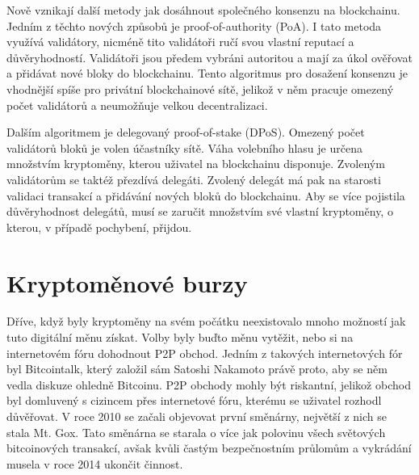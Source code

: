 Nově vznikají další metody jak dosáhnout společného konsenzu na blockchainu. Jedním z těchto nových způsobů je proof-of-authority (PoA). I tato
metoda využívá validátory, nicméně tito validátoři ručí svou vlastní reputací a důvěryhodností. Validátoři jsou předem vybráni autoritou a mají
za úkol ověřovat a přidávat nové bloky do blockchainu. Tento algoritmus pro dosažení konsenzu je vhodnější spíše pro privátní blockchainové sítě,
jelikož v něm pracuje omezený počet validátorů a neumožňuje velkou decentralizaci.

Dalším algoritmem je delegovaný proof-of-stake (DPoS). Omezený počet validátorů bloků je volen účastníky sítě. Váha volebního hlasu
je určena množstvím kryptoměny, kterou uživatel na blockchainu disponuje. Zvoleným validátorům se taktéž přezdívá delegáti. Zvolený delegát má pak
na starosti validaci transakcí a přidávání nových bloků do blockchainu. Aby se více pojistila důvěryhodnost delegátů, musí se zaručit množstvím
své vlastní kryptoměny, o kterou, v případě pochybení, přijdou.


\section{Kryptoměnové burzy}
\label{sec:Exchanges}
Dříve, když byly kryptoměny na svém počátku neexistovalo mnoho možností jak tuto digitální měnu získat. Volby byly buďto měnu vytěžit, nebo
si na internetovém fóru dohodnout P2P obchod. Jedním z takových internetových fór byl Bitcointalk, který založil sám Satoshi Nakamoto právě proto,
aby se něm vedla diskuze ohledně Bitcoinu. P2P obchody mohly být riskantní, jelikož obchod byl domluvený s cizincem přes internetové fóru, kterému
se uživatel rozhodl důvěřovat. V roce 2010 se začali objevovat první směnárny, největší z nich se stala Mt. Gox. Tato směnárna se starala o více jak polovinu
všech světových bitcoinových transakcí, avšak kvůli častým bezpečnostním průlomům a vykrádání musela v roce 2014 ukončit činnost.


